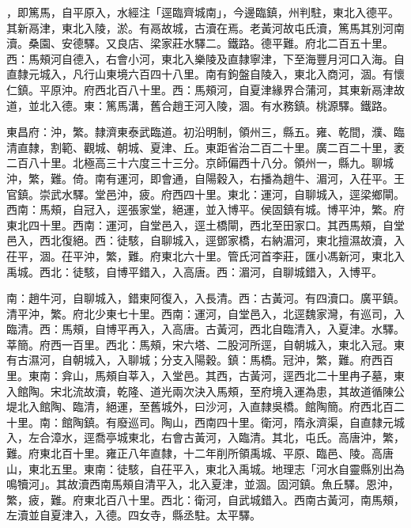 \begin{pinyinscope}
，即篤馬，自平原入，水經注「逕臨齊城南」，今邊臨鎮，州判駐，東北入德平。其新鬲津，東北入陵，淤。有鬲故城，古瀆在焉。老黃河故屯氏瀆，篤馬其別河南瀆。桑園、安德驛。又良店、梁家莊水驛二。鐵路。德平難。府北二百五十里。西：馬頰河自德入，右會小河，東北入樂陵及直隸寧津，下至海豐月河口入海。自直隸元城入，凡行山東境六百四十八里。南有鉤盤自陵入，東北入商河，涸。有懷仁鎮。平原沖。府西北百八十里。西：馬頰河，自夏津緣界合蒲河，其東新鬲津故道，並北入德。東：篤馬溝，舊合趙王河入陵，涸。有水務鎮。桃源驛。鐵路。

東昌府：沖，繁。隸濟東泰武臨道。初沿明制，領州三，縣五。雍、乾間，濮、臨清直隸，割範、觀城、朝城、夏津、丘。東距省治二百二十里。廣二百二十里，袤二百八十里。北極高三十六度三十三分。京師偏西十八分。領州一，縣九。聊城沖，繁，難。倚。南有運河，即會通，自陽穀入，右播為趙牛、湄河，入茌平。王官鎮。崇武水驛。堂邑沖，疲。府西四十里。東北：運河，自聊城入，逕梁鄉閘。西南：馬頰，自冠入，逕張家堂，絕運，並入博平。侯固鎮有城。博平沖，繁。府東北四十里。西南：運河，自堂邑入，逕土橋閘，西北至田家口。其西馬頰，自堂邑入，西北復絕。西：徒駭，自聊城入，逕鄧家橋，右納湄河，東北擅濕故瀆，入茌平，涸。茌平沖，繁，難。府東北六十里。管氏河首李莊，匯小馮新河，東北入禹城。西北：徒駭，自博平錯入，入高唐。西：湄河，自聊城錯入，入博平。

南：趙牛河，自聊城入，錯東阿復入，入長清。西：古黃河。有四瀆口。廣平鎮。清平沖，繁。府北少東七十里。西南：運河，自堂邑入，北逕魏家灣，有巡司，入臨清。西：馬頰，自博平再入，入高唐。古黃河，西北自臨清入，入夏津。水驛。莘簡。府西一百里。西北：馬頰，宋六塔、二股河所逕，自朝城入，東北入冠。東有古濕河，自朝城入，入聊城；分支入陽穀。鎮：馬橋。冠沖，繁，難。府西百里。東南：弇山，馬頰自莘入，入堂邑。其西，古黃河，逕西北二十里冉子墓，東入館陶。宋北流故瀆，乾隆、道光兩次決入馬頰，至府境入運為患，其故道循陳公堤北入館陶、臨清，絕運，至舊城外，曰沙河，入直隸吳橋。館陶簡。府西北百二十里。南：館陶鎮。有廢巡司。陶山，西南四十里。衛河，隋永濟渠，自直隸元城入，左合漳水，逕喬亭城東北，右會古黃河，入臨清。其北，屯氏。高唐沖，繁，難。府東北百十里。雍正八年直隸，十二年削所領禹城、平原、臨邑、陵。高唐山，東北五里。東南：徒駭，自茌平入，東北入禹城。地理志「河水自靈縣別出為鳴犢河」。其故瀆西南馬頰自清平入，北入夏津，並涸。固河鎮。魚丘驛。恩沖，繁，疲，難。府東北百八十里。西北：衛河，自武城錯入。西南古黃河，南馬頰，左瀆並自夏津入，入德。四女寺，縣丞駐。太平驛。


\end{pinyinscope}
